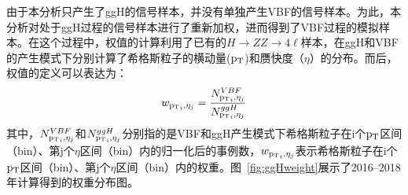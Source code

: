 由于本分析只产生了ggH的信号样本，并没有单独产生VBF的信号样本。为此，本分析对处于ggH过程的信号样本进行了重新加权，进而得到了VBF过程的模拟样本。在这个过程中，权值的计算利用了已有的$H\rightarrow ZZ\rightarrow4\ell$样本，在ggH和VBF的产生模式下分别计算了希格斯粒子的横动量($\mathrm{p_{T}}$)和赝快度（$\eta$）的分布。而后，权值的定义可以表达为：
\begin{equation}
    w_{\mathrm{p_{T}}_{i},\eta_{j}} = \frac{N_{\mathrm{p_{T}}_{i},\eta_{j}}^{VBF}}{N_{\mathrm{p_{T}}_{i},\eta_{j}}^{ggH}}
\end{equation}
其中，$N_{\mathrm{p_{T}}_{i},\eta_{j}}^{VBF}$和$N_{\mathrm{p_{T}}_{i},\eta_{j}}^{ggH}$分别指的是VBF和ggH产生模式下希格斯粒子在i个$\mathrm{p_{T}}$区间（bin）、第j个$\eta$区间（bin）内的归一化后的事例数，$w_{\mathrm{p_{T}}_{i},\eta_{j}}$表示希格斯粒子在i个$\mathrm{p_{T}}$区间（bin）、第j个$\eta$区间（bin）内的权重。图~\ref{fig:ggHweight}展示了2016--2018年计算得到的权重分布图。

